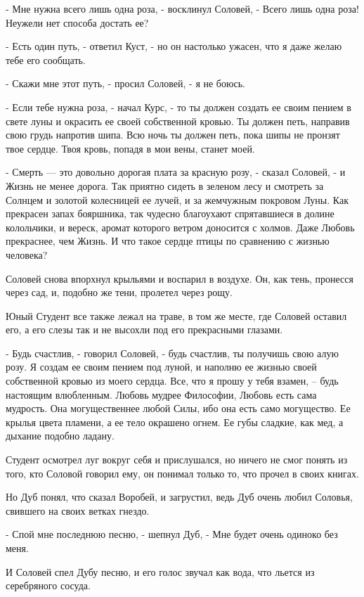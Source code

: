 \documentclass[a4paper]{article}
\theoremstyle{defin}
\theoremstyle{theorem}
\theoremstyle{prop}
\theoremstyle{lemma}
\theoremstyle{ex}
\theoremstyle{col}
\begin{document}
- Мне нужна всего лишь одна роза, - восклинул Соловей, - Всего лишь одна роза! Неужели нет способа достать ее?

- Есть один путь, - ответил Куст, - но он настолько ужасен, что я даже желаю тебе его сообщать.

- Скажи мне этот путь, - просил Соловей, - я не боюсь.

- Если тебе нужна роза, - начал Курс, - то ты должен создать ее своим пением в свете луны и окрасить ее своей собственной кровью. Ты должен петь, направив свою грудь напротив шипа. Всю ночь ты должен петь, пока шипы не пронзят твое сердце. Твоя кровь, попадя в мои вены, станет моей.

- Смерть --- это довольно дорогая плата за красную розу, - сказал Соловей, - и Жизнь не менее дорога. Так приятно сидеть в зеленом лесу и смотреть за Солнцем и золотой колесницей ее лучей, и за жемчужным покровом Луны. Как прекрасен запах бояршника, так чудесно благоухают спрятавшиеся в долине колольчики, и вереск, аромат которого ветром доносится с холмов. Даже Любовь прекраснее, чем Жизнь. И что такое сердце птицы по сравнению с жизнью человека?

Соловей снова впорхнул крыльями и воспарил в воздухе. Он, как тень, пронесся через сад, и, подобно же тени, пролетел через рощу.

Юный Студент все также лежал на траве, в том же месте, где Соловей оставил его, а его слезы так и не высохли под его прекрасными глазами.

- Будь счастлив, - говорил Соловей, - будь счастлив, ты получишь свою алую розу. Я создам ее своим пением под луной, и наполню ее жизнью своей собственной кровью из моего сердца. Все, что я прошу у тебя взамен, -- будь настоящим влюбленным. Любовь мудрее Философии, Любовь есть сама мудрость. Она могущественнее любой Силы, ибо она есть само могущество. Ее крылья цвета пламени, а ее тело окрашено огнем. Ее губы сладкие, как мед, а дыхание подобно ладану.

Студент осмотрел луг вокруг себя и прислушался, но ничего не смог понять из того, кто Соловой говорил ему, он понимал только то, что прочел в своих книгах.

Но Дуб понял, что сказал Воробей, и загрустил, ведь Дуб очень любил Соловья, свившего на своих ветках гнездо.

- Спой мне последнюю песню, - шепнул Дуб, - Мне будет очень одиноко без меня.

И Соловей спел Дубу песню, и его голос звучал как вода, что льется из серебряного сосуда.
\end{document}
